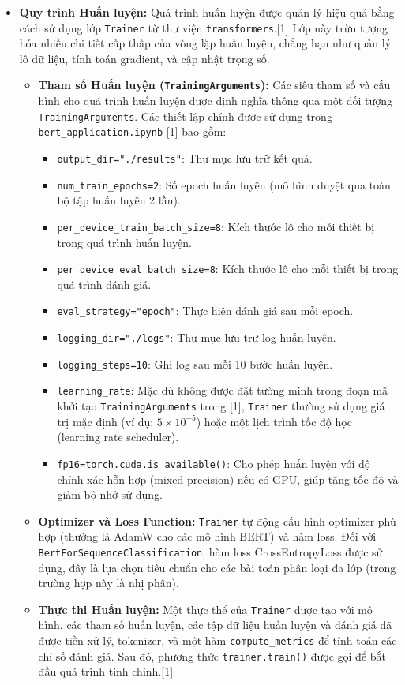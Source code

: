 \begin{itemize}
    \item \textbf{Quy trình Huấn luyện:}
    Quá trình huấn luyện được quản lý hiệu quả bằng cách sử dụng lớp \texttt{Trainer} từ thư viện \texttt{transformers}.[1] Lớp này trừu tượng hóa nhiều chi tiết cấp thấp của vòng lặp huấn luyện, chẳng hạn như quản lý lô dữ liệu, tính toán gradient, và cập nhật trọng số.
    \begin{itemize}
        \item \textbf{Tham số Huấn luyện (\texttt{TrainingArguments}):} Các siêu tham số và cấu hình cho quá trình huấn luyện được định nghĩa thông qua một đối tượng \texttt{TrainingArguments}. Các thiết lập chính được sử dụng trong \texttt{bert\_application.ipynb} [1] bao gồm:
            \begin{itemize}
                \item \texttt{output\_dir="./results"}: Thư mục lưu trữ kết quả.
                \item \texttt{num\_train\_epochs=2}: Số epoch huấn luyện (mô hình duyệt qua toàn bộ tập huấn luyện 2 lần).
                \item \texttt{per\_device\_train\_batch\_size=8}: Kích thước lô cho mỗi thiết bị trong quá trình huấn luyện.
                \item \texttt{per\_device\_eval\_batch\_size=8}: Kích thước lô cho mỗi thiết bị trong quá trình đánh giá.
                \item \texttt{eval\_strategy="epoch"}: Thực hiện đánh giá sau mỗi epoch.
                \item \texttt{logging\_dir="./logs"}: Thư mục lưu trữ log huấn luyện.
                \item \texttt{logging\_steps=10}: Ghi log sau mỗi 10 bước huấn luyện.
                \item \texttt{learning\_rate}: Mặc dù không được đặt tường minh trong đoạn mã khởi tạo \texttt{TrainingArguments} trong [1], \texttt{Trainer} thường sử dụng giá trị mặc định (ví dụ: $5 \times 10^{-5}$) hoặc một lịch trình tốc độ học (learning rate scheduler).
                \item \texttt{fp16=torch.cuda.is\_available()}: Cho phép huấn luyện với độ chính xác hỗn hợp (mixed-precision) nếu có GPU, giúp tăng tốc độ và giảm bộ nhớ sử dụng.
            \end{itemize}
        \item \textbf{Optimizer và Loss Function:} \texttt{Trainer} tự động cấu hình optimizer phù hợp (thường là AdamW cho các mô hình BERT) và hàm loss. Đối với \texttt{BertForSequenceClassification}, hàm loss CrossEntropyLoss được sử dụng, đây là lựa chọn tiêu chuẩn cho các bài toán phân loại đa lớp (trong trường hợp này là nhị phân).
        \item \textbf{Thực thi Huấn luyện:} Một thực thể của \texttt{Trainer} được tạo với mô hình, các tham số huấn luyện, các tập dữ liệu huấn luyện và đánh giá đã được tiền xử lý, tokenizer, và một hàm \texttt{compute\_metrics} để tính toán các chỉ số đánh giá. Sau đó, phương thức \texttt{trainer.train()} được gọi để bắt đầu quá trình tinh chỉnh.[1]
    \end{itemize}
\end{itemize}
